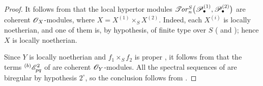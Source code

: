 \begin{proof}
It follows from  that the local hypertor modules $\mathscr{T}\!\mathit{or}_n^S
\bigl(
\mathscr{P}_\bullet^{(1)},\mathscr{P}_\bullet^{(2)}
\bigr)$
are coherent $\mathscr{O}_X$-modules, where
$X=X^{(1)}\times_SX^{(2)}$.  Indeed, each $X^{(i)}$ is locally
noetherian, and one of them is, by hypothesis, of finite type over
    $S$ ( and ); hence $X$ is
locally noetherian.

Since $Y$ is locally noetherian and
$f_1\times_Sf_2$ is proper , it follows from
 that the terms ${}^{(b)}\mathscr{E}_{pq}^2$ of
 are coherent $\mathscr{O}_Y$-modules.  All the spectral
sequences of  are biregular by hypothesis
$2^\circ$, so the conclusion follows from
.
\end{proof}

